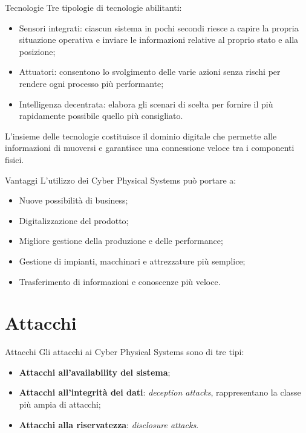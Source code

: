 \documentclass{beamer}
\begin{document}
\begin{frame}{Tecnologie}
Tre tipologie di tecnologie abilitanti:
\begin{itemize}
    \item Sensori integrati: ciascun sistema in pochi secondi riesce a capire la propria situazione operativa e inviare le informazioni relative al 
    proprio stato e alla posizione;
    \item Attuatori: consentono lo svolgimento delle varie azioni senza rischi per rendere ogni processo più performante;
    \item Intelligenza decentrata: elabora gli scenari di scelta per fornire il più rapidamente possibile quello più consigliato.
\end{itemize}

L'insieme delle tecnologie costituisce il dominio digitale che permette alle informazioni di muoversi e garantisce una connessione veloce tra i 
componenti fisici.

\end{frame}

\begin{frame}{Vantaggi}
L'utilizzo dei Cyber Physical Systems può portare a:
\begin{itemize}
    \item Nuove possibilità di business;
    \item Digitalizzazione del prodotto;
    \item Migliore gestione della produzione e delle performance;
    \item Gestione di impianti, macchinari e attrezzature più semplice;
    \item Trasferimento di informazioni e conoscenze più veloce.
\end{itemize}
    
\end{frame}

\section{Attacchi}

\begin{frame}{Attacchi}
Gli attacchi ai Cyber Physical Systems sono di tre tipi:
\begin{itemize}
    \item \textbf{Attacchi all'availability del sistema}; 
    \item \textbf{Attacchi all'integrità dei dati}: \textit{deception attacks}, rappresentano la classe più ampia di attacchi;
    \item \textbf{Attacchi alla riservatezza}: \textit{disclosure attacks}.
\end{itemize}

\end{frame}
\end{document}
